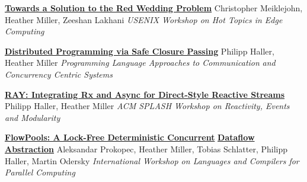 \documentclass[9pt]{article}
\begin{document}
\noindent\href{https://www.usenix.org/system/files/conference/hotedge18/hotedge18-papers-meiklejohn.pdf}{\bf Towards a Solution to the Red Wedding Problem}
\newline\noindent Christopher Meiklejohn, Heather Miller, Zeeshan Lakhani
\newline\noindent\emph{USENIX Workshop on Hot Topics in Edge Computing}
\bigskip

\noindent\href{https://infoscience.epfl.ch/record/205039}{\bf Distributed Programming via Safe Closure Passing}
\newline\noindent Philipp Haller, Heather Miller
\newline\noindent\emph{Programming Language Approaches to Communication}
\newline\noindent\emph{and Concurrency Centric Systems}
\bigskip

\noindent\href{http://infoscience.epfl.ch/record/188383}{\bf RAY: Integrating Rx and Async for Direct-Style Reactive Streams}
\newline\noindent Philipp Haller, Heather Miller
\newline\noindent\emph{ACM SPLASH Workshop on Reactivity, Events and Modularity}
\bigskip

\noindent\href{http://infoscience.epfl.ch/record/180265}{\bf FlowPools: A Lock-Free Deterministic Concurrent}\vspace{-0.03in}
\newline\noindent\href{http://infoscience.epfl.ch/record/180265}{\bf Dataflow Abstraction}
\newline\noindent Aleksandar Prokopec, Heather Miller, Tobias Schlatter,
\newline\noindent Philipp Haller, Martin Odersky
\newline\noindent\emph{International Workshop on Languages and Compilers for Parallel Computing}
\vspace{0.03in}
\newline{}
\vspace{-0.03in}
\newline{}
\vspace{-0.03in}
\newline{}
\bigskip
\end{document}
